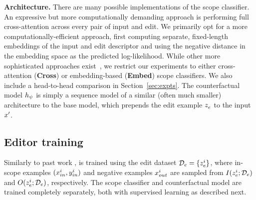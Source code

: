\documentclass{article}
\begin{document}



\textbf{Architecture.} There are many possible implementations of the scope classifier. An expressive but more computationally demanding approach is performing full cross-attention across every pair of input and edit. We primarily opt for a more computationally-efficient approach, first computing separate, fixed-length embeddings of the input and edit descriptor \citep[as in][]{karpukhin-etal-2020-dense} and using the negative distance in the embedding space as the predicted log-likelihood. While other more sophisticated approaches exist~\citep{khattab2020colbert,santhanam2021colbert}, we restrict our experiments to either cross-attention (\textbf{Cross}) or embedding-based (\textbf{Embed}) scope classifiers. We also include a head-to-head comparison in Section~\ref{sec:expts}.
The counterfactual model $\rep$ is simply a sequence model of a similar (often much smaller) architecture to the base model, which prepends the edit example $\ze$ to the input $\xunk$.

\subsection{Editor training}
\label{sec:editortraining}
Similarly to past work \citep{Cao2021EditingFK,mitchell2021fast,hase2021language}, {\fullname} is trained using the edit dataset $\editdata =\{\ze[i]\}$, where in-scope examples $(\xtest[i], \ytest[i])$ and negative examples $\xloc[i]$ are sampled from $I(\ze[i]; \editdata)$ and $O(\ze[i]; \editdata)$, respectively. The scope classifier and counterfactual model are trained completely separately, both with supervised learning as described next.
\end{document}
